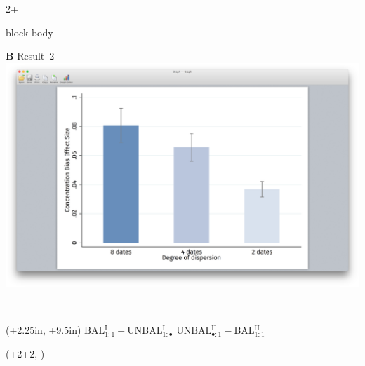 \documentclass{beamer}
\newlength{\blockTwo}
\newcommand{\balA}[1][1]{BAL$^\mathup{I}_{#1:#1}$\xspace}
\newcommand{\unbalA}[1][n]{UNBAL$^\mathup{I}_{1:#1}$\xspace}
\newcommand{\balB}[1][1]{BAL$^\mathup{II}_{#1:#1}$\xspace}
\newcommand{\unbalB}[1][n]{UNBAL$^\mathup{II}_{#1:1}$\xspace}
\begin{document}
\begin{frame}[t]
\begin{textblock*}{2\colwidth+\colsep}
\begin{alertblock}
\begin{beamercolorbox}[ht=8.0in, center]{block body}
\begin{minipage}[t]{0.46\textwidth}
		\Large\textbf{B} \textcolor{SpotColor}{\hspace{3.9in} {\firasemibold\small Result~2}} \\[15pt]
		\includegraphics[width=9.5in, trim={3.75in 1.75in 3.75in 2in}, clip]
			{1_Example_Content/Images/average_8_4_2.png}
	\end{minipage} \\[40pt]
\end{beamercolorbox}
\end{alertblock}

\end{textblock*}


\TPshowboxesfalse

\begin{textblock*}{\colwidth}(\leftmargin+2.25in, \blockTwo+9.5in)
	\centering \footnotesize \sffamily
	$\text{\balA} - \text{\unbalA[\bullet]}$
	\hspace{40pt}
	$\text{\unbalB[\bullet]} - \text{\balB}$
\end{textblock*}




\TPshowboxestrue

\begin{textblock*}{\colwidth}(\leftmargin+2\colwidth+2\colsep, \blockTwo)


\end{textblock*}
\end{frame}
\end{document}
